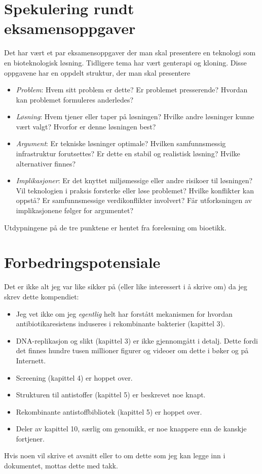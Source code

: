 \begin{appendices}
{\section{Spekulering rundt eksamensoppgaver}
Det har vært et par eksamensoppgaver der man skal presentere en teknologi som en bioteknologisk løsning. Tidligere tema har vært genterapi og kloning. Disse oppgavene har en oppdelt struktur, der man skal presentere
\begin{itemize}[noitemsep,nolistsep]
	\item \emph{Problem}: Hvem sitt problem er dette? Er problemet presserende? Hvordan kan problemet formuleres anderledes?
	\item \emph{Løsning}: Hvem tjener eller taper på løsningen? Hvilke andre løsninger kunne vært valgt? Hvorfor er denne løsningen best?
	\item \emph{Argument}: Er tekniske løsninger optimale? Hvilken samfunnsmessig infrastruktur forutsettes? Er dette en stabil og realistisk løsning? Hvilke alternativer finnes?
	\item \emph{Implikasjoner}: Er det knyttet miljømessige eller andre risikoer til løsningen? Vil teknologien i praksis forsterke eller løse problemet? Hvilke konflikter kan oppstå? Er samfunnsmessige verdikonflikter involvert? Får utforksningen av implikasjonene følger for argumentet?
\end{itemize}
Utdypningene på de tre punktene er hentet fra forelesning om bioetikk.

% 

\section{Forbedringspotensiale}
Det er ikke alt jeg var like sikker på (eller like interessert i å skrive om) da jeg skrev dette kompendiet:
\begin{itemize}[noitemsep,nolistsep]
	\item Jeg vet ikke om jeg \emph{egentlig} helt har forstått mekanismen for hvordan antibiotikaresistens induseres i rekombinante bakterier (kapittel 3).
	\item DNA-replikasjon og slikt (kapittel 3) er ikke gjennomgått i detalj. Dette fordi det finnes hundre tusen millioner figurer og videoer om dette i bøker og på Internett.
	\item Screening (kapittel 4) er hoppet over.
	\item Strukturen til antistoffer (kapittel 5) er beskrevet noe knapt.
	\item Rekombinante antistoffbibliotek (kapittel 5) er hoppet over.
	\item Deler av kapittel 10, særlig om genomikk, er noe knappere enn de kanskje fortjener.
\end{itemize}
Hvis noen vil skrive et avsnitt eller to om dette som jeg kan legge inn i dokumentet, mottas dette med takk.

}
\end{appendices}
